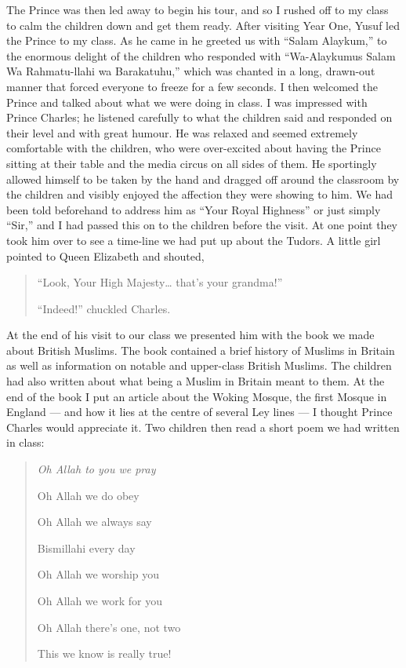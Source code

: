 \documentclass[12pt]{memoir}
\newcommand{\cor}[2]{#2} %
\def\–{-\hskip0pt}
\begin{document}
The Prince was then led away to begin his tour,
and so I rushed off to my class to calm the children down and get them ready.
After visiting Year One, Yusuf led the Prince to my class.
As he came in he greeted us with “Salam Alaykum,”
to the enormous delight of the children who responded with
“Wa-Alaykumus Salam Wa Rahmatu-llahi wa Barakatuhu,”
which was chanted in a long, drawn-out manner
that forced everyone to freeze for a few seconds.
I then welcomed the Prince and talked about what we were doing in class.
I was impressed with Prince Charles;
he listened carefully to what the children said
and responded on their level and with great humour.
He was relaxed and seemed extremely comfortable with the children,
who were over\–excited about having the Prince sitting at their table
and the media circus on all sides of them.
He sportingly allowed himself to be taken by the hand
and dragged off around the classroom by the children
and visibly enjoyed the affection they were showing to him.
We had been told \cor{before-hand}{beforehand} to address him as
“Your Royal Highness” or just simply “Sir,”
and I had passed this on to the children before the visit.
At one point they took him over to see a time-line
we had put up about the Tudors.
A little girl pointed to Queen Elizabeth and shouted,

\begin{quote}
“Look, Your High Majesty… that’s your grandma!”

“Indeed!” chuckled Charles.
\end{quote}

At the end of his visit to our class we presented him
with the book we made about British Muslims.
The book contained a brief history of Muslims in Britain
as well as information on notable and upper-class British Muslims.
The children had also written about
what being a Muslim in Britain meant to them.
At the end of the book I put an article about the Woking Mosque,
the first Mosque in England —
and how it lies at the centre of several Ley lines —
I thought Prince Charles would appreciate it.
Two children then read a short poem we had written in class:

\begin{quote}
\itshape
Oh Allah to you we pray

Oh Allah we do obey

Oh Allah we always say

Bismillahi every day

Oh Allah we worship you

Oh Allah we work for you

Oh Allah there’s one, not two

This we know is really true!
\end{quote}
\end{document}
